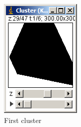 \documentclass[11pt]{article} %
\begin{document}
\begin{figure}
        \centering
        \begin{subfigure}[b]{0.3\textwidth}
                \centering
                \includegraphics[width=\textwidth]{figures/k-means_results_1}
                \caption{First cluster}
                \label{fig:k-means_res_1}
	\end{subfigure}%
	 ~
        \begin{subfigure}[b]{0.3\textwidth}
                \centering

\end{subfigure}
\end{figure}
\end{document}
